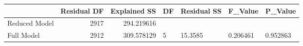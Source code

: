 \begin{tabular}{lrrllll}
\toprule
{} &  Residual DF &  Explained SS & DF & Residual SS &   F\_Value &   P\_Value \\
\midrule
Reduced Model &         2917 &    294.219616 &    &             &           &           \\
Full Model    &         2912 &    309.578129 &  5 &     15.3585 &  0.206461 &  0.952863 \\
\bottomrule
\end{tabular}
